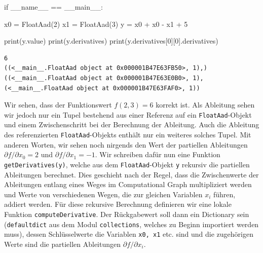 \documentclass[
  a4paper,
  DIV=11]{scrreprt}
\newenvironment{Shaded}{\begin{snugshade}}{\end{snugshade}}
\newcommand{\BuiltInTok}[1]{\textcolor[rgb]{0.00,0.23,0.31}{#1}}
\newcommand{\ControlFlowTok}[1]{\textcolor[rgb]{0.00,0.23,0.31}{#1}}
\newcommand{\DecValTok}[1]{\textcolor[rgb]{0.68,0.00,0.00}{#1}}
\newcommand{\NormalTok}[1]{\textcolor[rgb]{0.00,0.23,0.31}{#1}}
\newcommand{\OperatorTok}[1]{\textcolor[rgb]{0.37,0.37,0.37}{#1}}
\newcommand{\StringTok}[1]{\textcolor[rgb]{0.13,0.47,0.30}{#1}}
\newcommand{\VariableTok}[1]{\textcolor[rgb]{0.07,0.07,0.07}{#1}}
\theoremstyle{definition}
\theoremstyle{definition}
\theoremstyle{remark}
\begin{document}
\begin{Shaded}
\begin{Highlighting}[]
\ControlFlowTok{if} \VariableTok{\_\_name\_\_} \OperatorTok{==} \StringTok{\textquotesingle{}\_\_main\_\_\textquotesingle{}}\NormalTok{:}

\NormalTok{    x0 }\OperatorTok{=}\NormalTok{ FloatAad(}\DecValTok{2}\NormalTok{)}
\NormalTok{    x1 }\OperatorTok{=}\NormalTok{ FloatAad(}\DecValTok{3}\NormalTok{)}
\NormalTok{    y }\OperatorTok{=}\NormalTok{ x0 }\OperatorTok{+}\NormalTok{ x0 }\OperatorTok{{-}}\NormalTok{ x1 }\OperatorTok{+} \DecValTok{5}

    \BuiltInTok{print}\NormalTok{(y.value)}
    \BuiltInTok{print}\NormalTok{(y.derivatives)}
    \BuiltInTok{print}\NormalTok{(y.derivatives[}\DecValTok{0}\NormalTok{][}\DecValTok{0}\NormalTok{].derivatives)}
\end{Highlighting}
\end{Shaded}

\begin{verbatim}
6
((<__main__.FloatAad object at 0x000001B47E63FB50>, 1),)
((<__main__.FloatAad object at 0x000001B47E63E0B0>, 1), (<__main__.FloatAad object at 0x000001B47E63FAF0>, 1))
\end{verbatim}

Wir sehen, dass der Funktionswert \(f(2,3) = 6\) korrekt ist. Als
Ableitung sehen wir jedoch nur ein Tupel bestehend aus einer Referenz
auf ein \texttt{FloatAad}-Objekt und einem Zwischenschritt bei der
Berechnung der Ableitung. Auch die Ableitung des referenzierten
\texttt{FloatAad}-Objekts enthält nur ein weiteres solches Tupel. Mit
anderen Worten, wir sehen noch nirgends den Wert der partiellen
Ableitungen \(\partial f / \partial x_0 = 2\) und
\(\partial f / \partial x_1 = -1\). Wir schreiben dafür nun eine
Funktion \texttt{getDerivatives(y)}, welche aus dem
\texttt{FloatAad}-Objekt \texttt{y} rekursiv die partiellen Ableitungen
berechnet. Dies geschieht nach der Regel, dass die Zwischenwerte der
Ableitungen entlang eines Weges im Computational Graph multipliziert
werden und Werte von verschiedenen Wegen, die zur gleichen Variablen
\(x_i\) führen, addiert werden. Für diese rekursive Berechnung
definieren wir eine lokale Funktion \texttt{computeDerivative}. Der
Rückgabewert soll dann ein Dictionary sein (\texttt{defaultdict} aus dem
Modul \texttt{collections}, welches zu Beginn importiert werden muss),
dessen Schlüsselwerte die Variablen \texttt{x0,\ x1} etc. sind und die
zugehörigen Werte sind die partiellen Ableitungen
\(\partial f / \partial x_i\).
\end{document}
